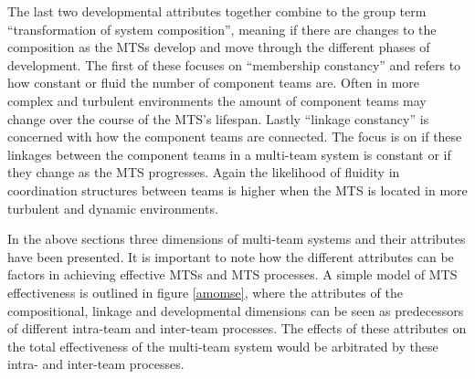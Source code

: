 The last two developmental attributes together combine to the group term ``transformation of system composition'', meaning if there are changes to the composition as the MTSs develop and move through the different phases of development. The first of these focuses on ``membership constancy'' and refers to how constant or fluid the number of component teams are. Often in more complex and turbulent environments the amount of component teams may change over the course of the MTS's lifespan. Lastly ``linkage constancy'' is concerned with how the component teams are connected. The focus is on if these linkages between the component teams in a multi-team system is constant or if they change as the MTS progresses. Again the likelihood of fluidity in coordination structures between teams is higher when the MTS is located in more turbulent and dynamic environments.

In the above sections three dimensions of multi-team systems and their attributes have been presented. It is important to note how the different attributes can be factors in achieving effective MTSs and MTS processes. A simple model of MTS effectiveness is outlined in figure \ref{amomse}, where the attributes of the compositional, linkage and developmental dimensions can be seen as predecessors of different intra-team and inter-team processes. The effects of these attributes on the total effectiveness of the multi-team system would be arbitrated by these intra- and inter-team processes.


